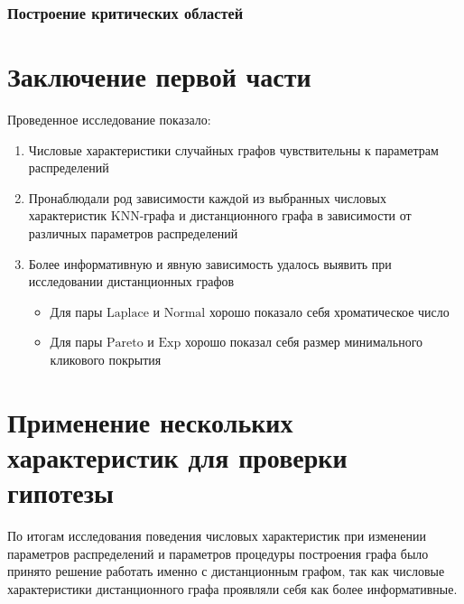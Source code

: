 \documentclass[a4paper,12pt]{article}
\begin{document}
\subsubsection{Построение критических областей}

\section{Заключение первой части}
Проведенное исследование показало:
\begin{enumerate}
    \item Числовые характеристики случайных графов чувствительны к параметрам распределений

    \item Пронаблюдали род зависимости каждой из выбранных числовых характеристик KNN-графа и дистанционного графа в зависимости от различных параметров распределений
    
    \item Более информативную и явную зависимость удалось выявить при исследовании дистанционных графов
    \begin{itemize}
        \item Для пары $\text{Laplace}$ и $\text{Normal}$ хорошо показало себя хроматическое число

        \item Для пары $\text{Pareto}$ и $\text{Exp}$ хорошо показал себя размер минимального кликового покрытия
    \end{itemize}
\end{enumerate}

\section{Применение нескольких характеристик для проверки гипотезы}
По итогам исследования поведения числовых характеристик при изменении параметров распределений и параметров процедуры построения графа было принято решение работать именно с дистанционным графом, так как числовые характеристики дистанционного графа проявляли себя как более информативные.
\end{document}
